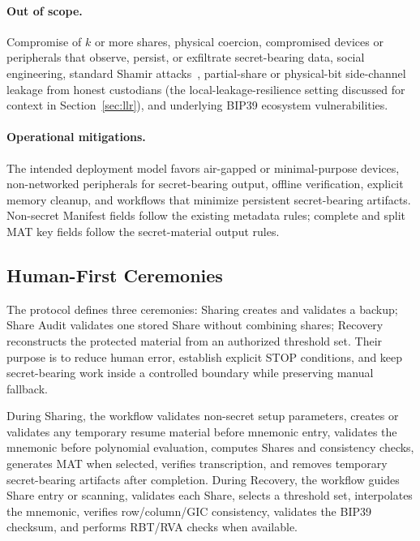 \documentclass[11pt]{article}
\begin{document}
\paragraph{Out of scope.} Compromise of $k$ or more shares, physical coercion, compromised devices or peripherals that observe, persist, or exfiltrate secret-bearing data, social engineering, standard Shamir attacks~\cite{shamir1979,stinson2006}, partial-share or physical-bit side-channel leakage from honest custodians (the local-leakage-resilience setting discussed for context in Section~\ref{sec:llr}), and underlying BIP39 ecosystem vulnerabilities.

\paragraph{Operational mitigations.} The intended deployment model favors air-gapped or minimal-purpose devices, non-networked peripherals for secret-bearing output, offline verification, explicit memory cleanup, and workflows that minimize persistent secret-bearing artifacts. Non-secret Manifest fields follow the existing metadata rules; complete and split MAT key fields follow the secret-material output rules.

\subsection{Human-First Ceremonies}
\label{sec:assisted-ceremony}

The protocol defines three ceremonies: Sharing creates and validates a backup; Share Audit validates one stored Share without combining shares; Recovery reconstructs the protected material from an authorized threshold set. Their purpose is to reduce human error, establish explicit STOP conditions, and keep secret-bearing work inside a controlled boundary while preserving manual fallback.

During Sharing, the workflow validates non-secret setup parameters, creates or validates any temporary resume material before mnemonic entry, validates the mnemonic before polynomial evaluation, computes Shares and consistency checks, generates MAT when selected, verifies transcription, and removes temporary secret-bearing artifacts after completion. During Recovery, the workflow guides Share entry or scanning, validates each Share, selects a threshold set, interpolates the mnemonic, verifies row/column/GIC consistency, validates the BIP39 checksum, and performs RBT/RVA checks when available.
\end{document}
